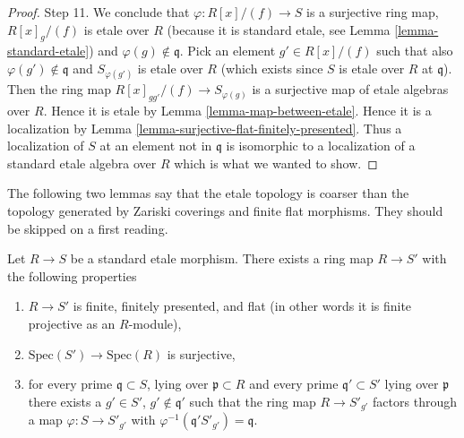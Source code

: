 \begin{proof}
\medskip\noindent
Step 11.
We conclude that $\varphi : R[x]/(f) \to S$ is a surjective ring map,
$R[x]_g/(f)$ is etale over $R$ (because it is standard etale,
see Lemma \ref{lemma-standard-etale}) and $\varphi(g) \not \in \mathfrak q$.
Pick an element $g' \in R[x]/(f)$ such that
also $\varphi(g') \not \in \mathfrak q$ and $S_{\varphi(g')}$
is etale over $R$ (which exists since $S$ is etale over $R$ at
$\mathfrak q$). Then the ring map
$R[x]_{gg'}/(f) \to S_{\varphi(g)}$ is a surjective map of etale
algebras over $R$. Hence it is etale by Lemma \ref{lemma-map-between-etale}.
Hence it is a localization by
Lemma \ref{lemma-surjective-flat-finitely-presented}.
Thus a localization of $S$ at an element not in $\mathfrak q$ is
isomorphic to a localization of a standard etale algebra over $R$
which is what we wanted to show.
\end{proof}

\noindent
The following two lemmas say that the etale topology is coarser than the
topology generated by Zariski coverings and finite flat morphisms.
They should be skipped on a first reading.

\begin{lemma}
\label{lemma-standard-etale-finite-flat-Zariski}
Let $R \to S$ be a standard etale morphism.
There exists a ring map $R \to S'$ with the following properties
\begin{enumerate}
\item $R \to S'$ is finite, finitely presented, and flat
(in other words it is finite projective as an $R$-module),
\item $\text{Spec}(S') \to \text{Spec}(R)$ is surjective,
\item for every prime $\mathfrak q \subset S$, lying over
$\mathfrak p \subset R$ and every prime
$\mathfrak q' \subset S'$ lying over $\mathfrak p$ there exists
a $g' \in S'$, $g' \not \in \mathfrak q'$
such that the ring map $R \to S'_{g'}$ factors
through a map $\varphi : S \to S'_{g'}$ with
$\varphi^{-1}(\mathfrak q'S'_{g'}) = \mathfrak q$.
\end{enumerate}
\end{lemma}

